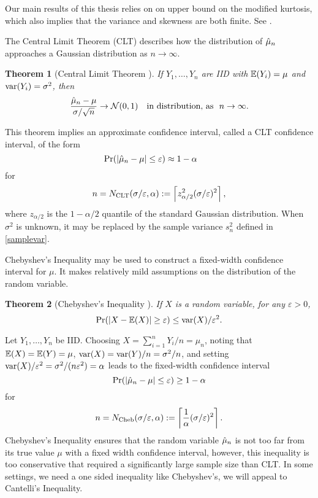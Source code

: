 \documentclass{iitthesis}
\newtheorem{theorem}{Theorem}[section]
\theoremstyle{definition}
\begin{document}
Our main results of this thesis relies on on upper bound on the modified kurtosis, which also implies that the variance and skewness are both finite. See \cite{HJLO12}.


The Central Limit Theorem (CLT) describes how the distribution of $\hat{\mu}_n$ approaches a Gaussian distribution as $n \to \infty$.
\begin{theorem}[Central Limit Theorem {\cite[Theorem 21.1]{JP04}}] \label{clt} 
If $Y_1, \ldots, Y_n$ are IID with $\mathbb{E}(Y_i)=\mu$ and $\operatorname{var}(Y_i) = \sigma^2$, then
$$
\frac{\hmu_n-\mu}{\sigma/\sqrt{n}} \to \dnorm(0,1) \quad \text{in distribution, as} \ \ n\to\infty.
$$
\end{theorem}
This theorem implies an approximate confidence interval, called a CLT confidence interval, of the form
\[
\Pr(\left \lvert \hat{\mu}_{n}-\mu \right \rvert \le \varepsilon) \approx 1- \alpha \qquad \]
for 
\begin{equation}\label{NCLT}
n= N_{\text{CLT}}(\sigma/\varepsilon,\alpha) := \left \lceil z_{\alpha/2}^2 (\sigma/\varepsilon)^2 \right \rceil,
\end{equation}
where $z_{\alpha/2}$ is the $1-\alpha/2$ quantile of the standard Gaussian distribution.  When $\sigma^2$ is unknown, it may be replaced by the sample variance $s_n^2$ defined in \eqref{samplevar}.


Chebyshev's Inequality may be used to construct a fixed-width confidence interval for $\mu$.  It makes relatively mild assumptions on the distribution of the random variable.

\begin{theorem}[Chebyshev's Inequality {\cite[6.1.c]{LB10}}] \label{ChebyThm}
If $X$ is a random variable, for any $\varepsilon>0$, 
$$\Pr(\left \lvert X-\mathbb{E}(X) \right \rvert \ge \varepsilon) \le  \operatorname{var}(X)/\varepsilon^2.$$
\end{theorem}
Let $Y_1, \ldots, Y_n$ be IID. Choosing $X=\sum_{i=1}^n Y_i/n = \mu_n$, noting that $\mathbb{E}(X) = \mathbb{E}(Y) = \mu$, $\operatorname{var}(X) = \operatorname{var}(Y)/n = \sigma^2/n$, and setting $\operatorname{var}(X)/\varepsilon^2=\sigma^2/(n\varepsilon^2) = \alpha$ leads to the fixed-width confidence interval 
\[
\Pr(\left \lvert \hat{\mu}_{n}-\mu \right \rvert \le \varepsilon) \ge 1- \alpha 
\]
 for 
 \begin{align}\label{NCheb}
n=N_{\text{Cheb}}(\sigma/\varepsilon,\alpha):= \left \lceil \frac{1}{\alpha} (\sigma/\varepsilon)^2\right \rceil.
 \end{align}
 Chebyshev's Inequality ensures that the random variable $\hat{\mu}_n$ is not too far from its true value $\mu$ with a fixed width confidence interval, however, this inequality is too conservative that required a significantly large sample size than CLT. In some settings, we need a one sided inequality like Chebyshev's, we will appeal to Cantelli's Inequality.
 
\end{document}
